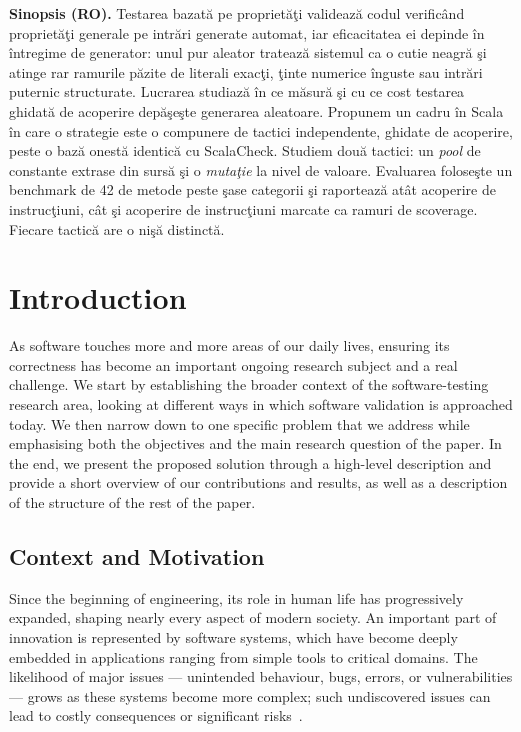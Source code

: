 \documentclass[11pt,a4paper]{report}
\begin{document}
\vspace{0.6cm}
\noindent\textbf{Sinopsis (RO).}
Testarea bazat\u{a} pe propriet\u{a}\c{t}i valideaz\u{a} codul verificând propriet\u{a}\c{t}i generale pe
intr\u{a}ri generate automat, iar eficacitatea ei depinde în întregime de generator: unul pur aleator
trateaz\u{a} sistemul ca o cutie neagr\u{a} \c{s}i atinge rar ramurile p\u{a}zite de literali exac\c{t}i, \c{t}inte
numerice înguste sau intr\u{a}ri puternic structurate. Lucrarea studiaz\u{a} în ce m\u{a}sur\u{a} \c{s}i cu ce
cost testarea ghidat\u{a} de acoperire dep\u{a}\c{s}e\c{s}te generarea aleatoare. Propunem un cadru în Scala în
care o strategie este o compunere de tactici independente, ghidate de acoperire, peste o baz\u{a} onest\u{a}
identic\u{a} cu ScalaCheck. Studiem dou\u{a} tactici: un \emph{pool} de constante extrase din surs\u{a}
\c{s}i o \emph{muta\c{t}ie} la nivel de valoare. Evaluarea folose\c{s}te un benchmark de 42 de metode peste
\c{s}ase categorii \c{s}i raporteaz\u{a} atât acoperire de instruc\c{t}iuni, cât \c{s}i acoperire de instruc\c{t}iuni
marcate ca ramuri de scoverage. Fiecare tactic\u{a} are o ni\c{s}\u{a} distinct\u{a}.

\tableofcontents

\chapter{Introduction}
\label{ch:intro}

As software touches more and more areas of our daily lives, ensuring its correctness has become an
important ongoing research subject and a real challenge. We start by establishing the broader context of
the software-testing research area, looking at different ways in which software validation is approached
today. We then narrow down to one specific problem that we address while emphasising both the objectives
and the main research question of the paper. In the end, we present the proposed solution through a
high-level description and provide a short overview of our contributions and results, as well as a
description of the structure of the rest of the paper.

\section{Context and Motivation}
\label{sec:context}

Since the beginning of engineering, its role in human life has progressively expanded, shaping nearly
every aspect of modern society. An important part of innovation is represented by software systems, which
have become deeply embedded in applications ranging from simple tools to critical domains. The likelihood
of major issues — unintended behaviour, bugs, errors, or vulnerabilities — grows as these systems become
more complex; such undiscovered issues can lead to costly consequences or significant risks~\cite{nist2002}.
\end{document}
